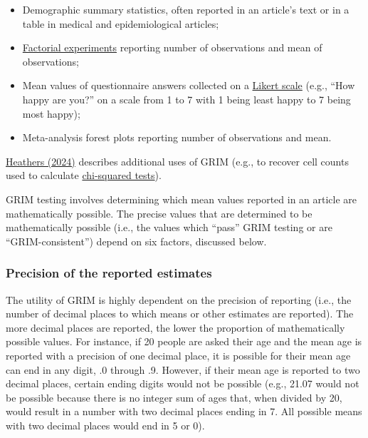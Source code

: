 \documentclass[letterpaper, 12pt]{article}
\begin{document}
\begin{itemize}
    \setlength\itemsep{-0.5em}
    \item Demographic summary statistics, often reported in an article's text or in a table in medical and epidemiological articles;
    \item \href{https://en.wikipedia.org/wiki/Factorial_experiment}{Factorial experiments} reporting number of observations and mean of observations;
    \item Mean values of questionnaire answers collected on a \href{https://en.wikipedia.org/wiki/Likert_scale}{Likert scale} (e.g., ``How happy are you?'' on a scale from 1 to 7 with 1 being least happy to 7 being most happy);
    \item Meta-analysis forest plots reporting number of observations and mean.
\end{itemize}
\href{https://doi.org/10.17605/OSF.IO/M82S6}{Heathers (2024)} describes additional uses of GRIM (e.g., to recover cell counts used to calculate \href{https://en.wikipedia.org/wiki/Chi-squared_test}{chi-squared tests}).


GRIM testing involves determining which mean values reported in an article are mathematically possible. The precise values that are determined to be mathematically possible (i.e., the values which ``pass'' GRIM testing or are ``GRIM-consistent'') depend on six factors, discussed below.

\subsubsection*{Precision of the reported estimates}

The utility of GRIM is highly dependent on the precision of reporting (i.e., the number of decimal places to which means or other estimates are reported). The more decimal places are reported, the lower the proportion of mathematically possible values. For instance, if 20 people are asked their age and the mean age is reported with a precision of one decimal place, it is possible for their mean age can end in any digit, .0 through .9. However, if their mean age is reported to two decimal places, certain ending digits would not be possible (e.g., 21.07 would not be possible because there is no integer sum of ages that, when divided by 20, would result in a number with two decimal places ending in 7. All possible means with two decimal places would end in 5 or 0).
\end{document}
